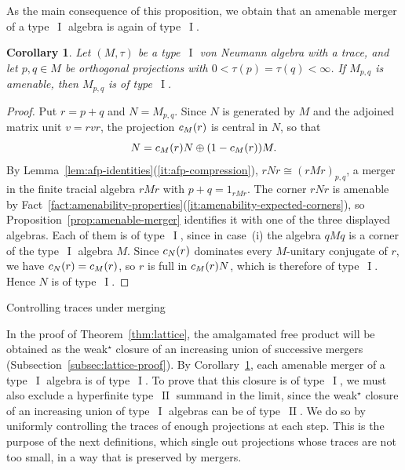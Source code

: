 \documentclass[11pt]{amsart}
\makeatletter
\numberwithin{equation}{section}
\def\subsection{\@startsection{subsection}{2}%
  \z@{.7\linespacing\@plus.7\linespacing}{.3\linespacing}%
  {\normalfont\bfseries}}
\DeclareMathOperator{\I}{I}
\DeclareMathOperator{\II}{II}
\newcommand{\@optsub}[1]{\if\relax\detokenize{#1}\relax\else_{#1}\fi}
\newcommand{\csupp}[2][]{c\@optsub{#1}(#2)}
\newtheorem{Cor}[The]{Corollary}
\theoremstyle{definition}
\makeatother
\begin{document}
As the main consequence of this proposition, we obtain that an amenable merger of a type~$\I$ algebra is again of type~$\I$.

\begin{Cor}
    \label{cor:amenable-merger-type-i}
    Let $(M,\tau)$ be a type~$\I$ von Neumann algebra with a trace, and let $p,q\in M$ be orthogonal projections with $0<\tau(p)=\tau(q)<\infty$. If $M_{p,q}$ is amenable, then $M_{p,q}$ is of type~$\I$.
\end{Cor}

\begin{proof}
    Put $r=p+q$ and $N=M_{p,q}$. Since $N$ is generated by $M$ and the adjoined matrix unit $v=rvr$, the projection $\csupp[M]{r}$ is central in $N$, so that
    $$
        N=\csupp[M]{r}N\oplus(1-\csupp[M]{r})M.
    $$
    By Lemma~\ref{lem:afp-identities}\textup{(\ref*{it:afp-compression})}, $rNr\cong(rMr)_{p,q}$, a merger in the finite tracial algebra $rMr$ with $p+q=1_{rMr}$. The corner $rNr$ is amenable by Fact~\ref{fact:amenability-properties}\textup{(\ref*{it:amenability-expected-corners})}, so Proposition~\ref{prop:amenable-merger} identifies it with one of the three displayed algebras. Each of them is of type~$\I$, since in case~\textup{(i)} the algebra $qMq$ is a corner of the type~$\I$ algebra $M$. Since $\csupp[N]{r}$ dominates every $M$-unitary conjugate of $r$, we have $\csupp[N]{r}=\csupp[M]{r}$, so $r$ is full in $\csupp[M]{r}N$, which is therefore of type~$\I$. Hence $N$ is of type~$\I$.
\end{proof}


\subsection{Controlling traces under merging}
\label{subsec:afp-mergers}


In the proof of Theorem~\ref{thm:lattice}, the amalgamated free product will be obtained as the weak$^\star$ closure of an increasing union of successive mergers (Subsection~\ref{subsec:lattice-proof}). By Corollary~\ref{cor:amenable-merger-type-i}, each amenable merger of a type~$\I$ algebra is of type~$\I$. To prove that this closure is of type~$\I$, we must also exclude a hyperfinite type~$\II$ summand in the limit, since the weak$^\star$ closure of an increasing union of type~$\I$ algebras can be of type~$\II$. We do so by uniformly controlling the traces of enough projections at each step. This is the purpose of the next definitions, which single out projections whose traces are not too small, in a way that is preserved by mergers.
\end{document}
